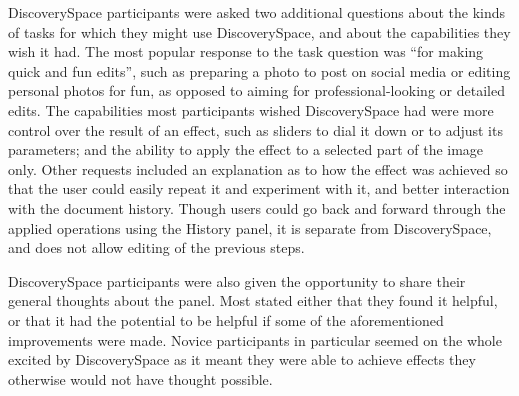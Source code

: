 Discovery\-Space participants were asked two additional questions about the kinds of tasks for which they might use Discovery\-Space, and about the capabilities they wish it had. The most popular response to the task question was ``for making quick and fun edits'', such as preparing a photo to post on social media or editing personal photos for fun, as opposed to aiming for professional-looking or detailed edits. The capabilities most participants wished Discovery\-Space had were more control over the result of an effect, such as sliders to dial it down or to adjust its parameters; and the ability to apply the effect to a selected part of the image only. Other requests included an explanation as to how the effect was achieved so that the user could easily repeat it and experiment with it, and better interaction with the document history. Though users could go back and forward through the applied operations using the History panel, it is separate from Discovery\-Space, and does not allow editing of the previous steps.

Discovery\-Space participants were also given the opportunity to share their general thoughts about the panel. Most stated either that they found it helpful, or that it had the potential to be helpful if some of the aforementioned improvements were made. Novice participants in particular seemed on the whole excited by Discovery\-Space as it meant they were able to achieve effects they otherwise would not have thought possible.
